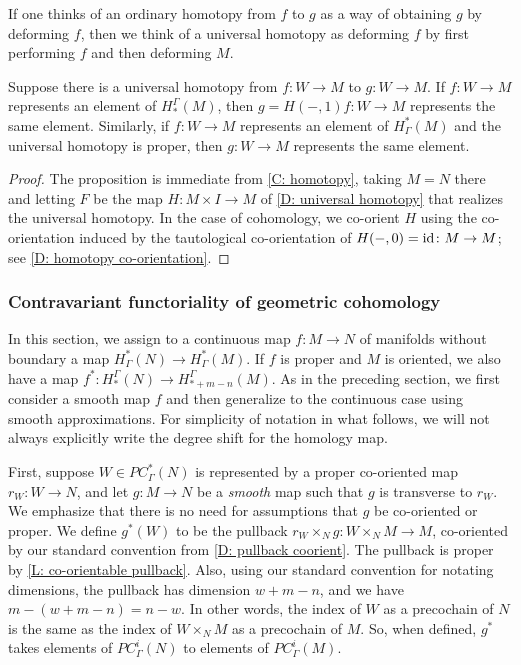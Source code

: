 If one thinks of an ordinary homotopy from $f$ to $g$ as a way of obtaining $g$ by deforming $f$, then we think of a universal homotopy as deforming $f$ by first performing $f$ and then deforming $M$.


\begin{proposition}\label{P: universal homotopy}
Suppose there is a universal homotopy from $f \colon W\to M$ to $g \colon W\to M$. If $f \colon W\to M$ represents an element of $H_*^\Gamma(M)$, then $g = H(-,1)f \colon W\to M$ represents the same element. Similarly, if $f \colon W\to M$ represents an element of $H^*_\Gamma(M)$ and the universal homotopy is proper, then $g \colon W\to M$ represents the same element.
\end{proposition}
\begin{proof}
The proposition is immediate from \cref{C: homotopy}, taking $M=N$ there and letting $F$ be the map $H \colon M \times I \to M$ of \cref {D: universal homotopy} that realizes the universal homotopy. In the case of cohomology, we co-orient $H$ using the co-orientation induced by the tautological co-orientation of $H(-,0) = \mathrm{id} \colon M \to M$; see \cref{D: homotopy co-orientation}.
\end{proof}







\subsubsection{Contravariant functoriality of geometric cohomology}\label{S: cohomology pullback}

In this section, we assign to a continuous map $f \colon M \to N$ of manifolds without boundary a map $H^*_\Gamma(N) \to H^*_\Gamma(M)$.
If $f$ is proper and $M$ is oriented, we also have a map $f^* \colon H_*^\Gamma(N) \to H_{*+m-n}^\Gamma(M)$.
As in the preceding section, we first consider a smooth map $f$ and then generalize to the continuous case using smooth approximations. 
For simplicity of notation in what follows, we will not always explicitly write the degree shift for the homology map.

First, suppose $W \in PC^*_\Gamma(N)$ is represented by a proper co-oriented map $r_W \colon W \to N$, and let $g \colon M \to N$ be a \textit{smooth} map such that $g$ is transverse to $r_W$.
We emphasize that there is no need for assumptions that $g$ be co-oriented or proper.
We define $g^*(W)$ to be the pullback $r_W \times_N g \colon W \times_N M \to M$, co-oriented by our standard convention from \cref{D: pullback coorient}.
The pullback is proper by \cref{L: co-orientable pullback}.
Also, using our standard convention for notating dimensions, the pullback has dimension $w+m-n$, and we have $m - (w+m-n) = n - w$. In other words, the index of $W$ as a precochain of $N$ is the same as the index of $W \times_N M$ as a precochain of $M$. 
So, when defined,  $g^*$ takes elements of $PC_\Gamma^i(N)$ to elements of $PC_\Gamma^i(M)$.

